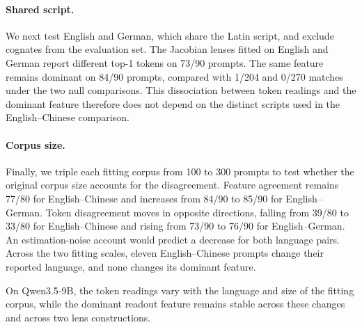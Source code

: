 \paragraph{Shared script.}
We next test English and German, which share the Latin script, and
exclude cognates from the evaluation set. The Jacobian lenses fitted on
English and German report different top-1 tokens on 73/90 prompts. The
same feature remains dominant on 84/90 prompts, compared with 1/204 and
0/270 matches under the two null comparisons. This dissociation between
token readings and the dominant feature therefore does not depend on
the distinct scripts used in the English--Chinese comparison.

\paragraph{Corpus size.}
Finally, we triple each fitting corpus from 100 to 300 prompts to test
whether the original corpus size accounts for the disagreement. Feature
agreement remains 77/80 for English--Chinese and increases from 84/90
to 85/90 for English--German. Token disagreement moves in opposite
directions, falling from 39/80 to 33/80 for English--Chinese and rising
from 73/90 to 76/90 for English--German. An estimation-noise account
would predict a decrease for both language pairs. Across the two fitting scales, eleven English--Chinese prompts
change their reported language, and none changes its dominant feature.

On Qwen3.5-9B, the token readings vary with the language and size of
the fitting corpus, while the dominant readout feature remains stable
across these changes and across two lens constructions.
